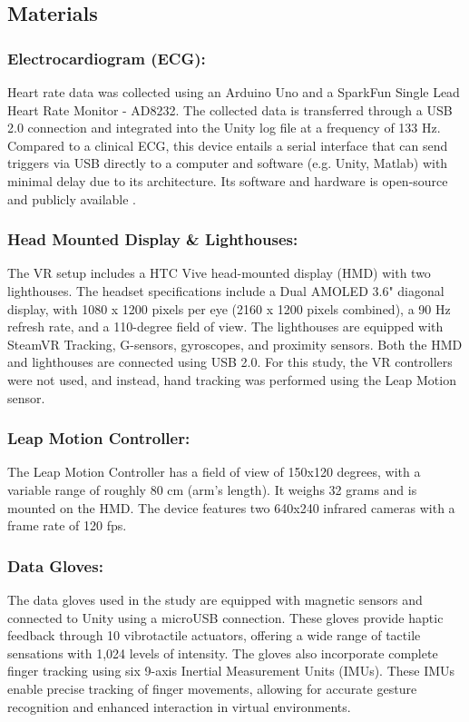 \documentclass[12pt,oneside,openright]{report}
\begin{document}
    
\subsection*{Materials}
\subsubsection*{Electrocardiogram (ECG):}
Heart rate data was collected using an Arduino Uno and a SparkFun Single Lead Heart Rate Monitor - AD8232. The collected data is transferred through a USB 2.0 connection and integrated into the Unity log file at a frequency of 133 Hz. Compared to a clinical ECG, this device entails a serial interface that can send triggers via USB directly to a computer and software (e.g. Unity, Matlab) with minimal delay due to its architecture. Its software and hardware is open-source and publicly available \parencite{TimsECG}.

\subsubsection*{Head Mounted Display \& Lighthouses:}
The VR setup includes a HTC Vive head-mounted display (HMD) with two lighthouses. The headset specifications include a Dual AMOLED 3.6" diagonal display, with 1080 x 1200 pixels per eye (2160 x 1200 pixels combined), a 90 Hz refresh rate, and a 110-degree field of view. The lighthouses are equipped with SteamVR Tracking, G-sensors, gyroscopes, and proximity sensors. Both the HMD and lighthouses are connected using USB 2.0. For this study, the VR controllers were not used, and instead, hand tracking was performed using the Leap Motion sensor.

\subsubsection*{Leap Motion Controller:}
The Leap Motion Controller has a field of view of 150x120 degrees, with a variable range of roughly 80 cm (arm's length). It weighs 32 grams and is mounted on the HMD. The device features two 640x240 infrared cameras with a frame rate of 120 fps.

\subsubsection*{Data Gloves:}
The data gloves used in the study are equipped with magnetic sensors and connected to Unity using a microUSB connection. These gloves provide haptic feedback through 10 vibrotactile actuators, offering a wide range of tactile sensations with 1,024 levels of intensity. The gloves also incorporate complete finger tracking using six 9-axis Inertial Measurement Units (IMUs). These IMUs enable precise tracking of finger movements, allowing for accurate gesture recognition and enhanced interaction in virtual environments.
\end{document}
